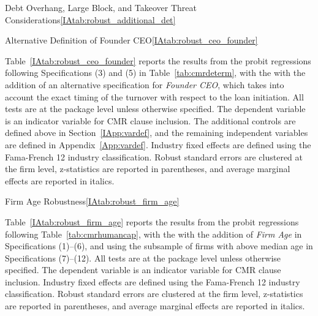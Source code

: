 \documentclass[12pt]{article}
\begin{document}
\begin{appendices}
\begin{singlespace}
\begin{papertable}{Debt Overhang, Large Block, and Takeover Threat Considerations}{\ref{IAtab:robust_additional_det}}{}
\end{papertable}





\begin{papertable}{Alternative Definition of Founder CEO}{\ref{IAtab:robust_ceo_founder}}{}
  \label{IAtab:robust_ceo_founder}

  Table~\ref{IAtab:robust_ceo_founder} reports the results from the probit regressions following Specifications (3) and (5) in Table~\ref{tab:cmrdeterm}, with the with the addition of an alternative specification for \textit{Founder CEO}, which takes into account the exact timing of the turnover with respect to the loan initiation.
  All tests are at the package level unless otherwise specified.
  The dependent variable is an indicator variable for CMR clause inclusion.
  The additional controls are defined above in Section~\ref{IApp:vardef}, and the remaining independent variables are defined in Appendix~\ref{App:vardef}.
  Industry fixed effects are defined using the Fama-French 12 industry classification.
  Robust standard errors are clustered at the firm level, z-statistics are reported in parentheses, and average marginal effects are reported in italics.
  \postamblesig

  \startdata
  
\end{papertable}




\begin{landscapepapertable}{Firm Age Robustness}{\ref{IAtab:robust_firm_age}}{}
  \label{IAtab:robust_firm_age}

  Table~\ref{IAtab:robust_firm_age} reports the results from the probit regressions following Table~\ref{tab:cmrhumancap}, with the with the addition of \textit{Firm Age} in Specifications (1)--(6), and using the subsample of firms with above median age in Specifications (7)--(12).
  All tests are at the package level unless otherwise specified.
  The dependent variable is an indicator variable for CMR clause inclusion.
  Industry fixed effects are defined using the Fama-French 12 industry classification.
  Robust standard errors are clustered at the firm level, z-statistics are reported in parentheses, and average marginal effects are reported in italics.
  \postamble

  \startdata
  
\end{landscapepapertable}





\end{singlespace}
\end{appendices}
\end{document}
